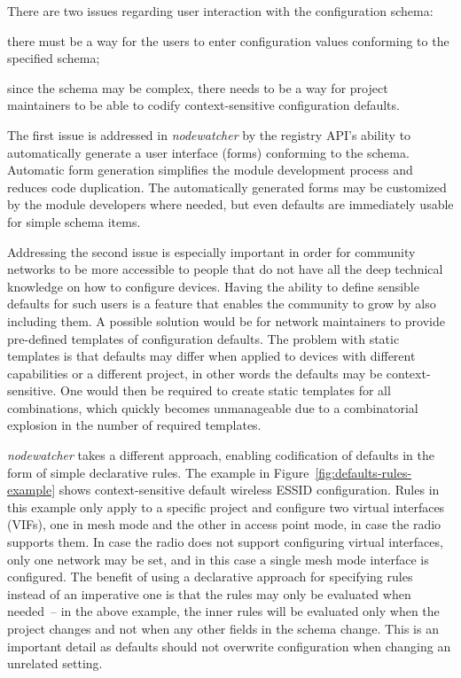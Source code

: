 \documentclass[5p,sort&compress]{elsarticle}
\newcommand{\nodewatcher}{\textit{nodewatcher}}
\begin{document}
There are two issues regarding user interaction with the configuration schema:
\begin{enumerate*}[label=\itshape\alph*\upshape)]
\item there must be a way for the users to enter configuration values conforming to the specified schema;
\item since the schema may be complex, there needs to be a way for project maintainers to be able to codify context-sensitive configuration defaults.
\end{enumerate*}
The first issue is addressed in \nodewatcher{} by the registry API's ability to automatically generate a user interface (forms) conforming to the schema.
Automatic form generation simplifies the module development process and reduces code duplication.
The automatically generated forms may be customized by the module developers where needed, but even defaults are immediately usable for simple schema items.

Addressing the second issue is especially important in order for community networks to be more accessible to people that do not have all the deep technical knowledge on how to configure devices.
Having the ability to define sensible defaults for such users is a feature that enables the community to grow by also including them.
A possible solution would be for network maintainers to provide pre-defined templates of configuration defaults.
The problem with static templates is that defaults may differ when applied to devices with different capabilities or a different project, in other words the defaults may be context-sensitive.
One would then be required to create static templates for all combinations, which quickly becomes unmanageable due to a combinatorial explosion in the number of required templates.


\nodewatcher{} takes a different approach, enabling codification of defaults in the form of simple declarative rules.
The example in Figure~\ref{fig:defaults-rules-example} shows context-sensitive default wireless ESSID configuration.
Rules in this example only apply to a specific project and configure two virtual interfaces (VIFs), one in mesh mode and the other in access point mode, in case the radio supports them.
In case the radio does not support configuring virtual interfaces, only one network may be set, and in this case a single mesh mode interface is configured.
The benefit of using a declarative approach for specifying rules instead of an imperative one is that the rules may only be evaluated when needed~-- in the above example, the inner rules will be evaluated only when the project changes and not when any other fields in the schema change.
This is an important detail as defaults should not overwrite configuration when changing an unrelated setting.
\end{document}
